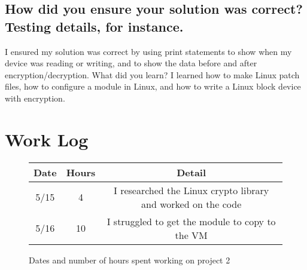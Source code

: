\documentclass[journal,letterpaper,draftclsnofoot,onecolumn,10pt]{IEEEtran}
\begin{document}
\subsection{How did you ensure your solution was correct? Testing details, for instance.}
I ensured my solution was correct by using print statements to show when my device was reading or writing, and to show the data before and after encryption/decryption.
{What did you learn?}
I learned how to make Linux patch files, how to configure a module in Linux, and how to write a Linux block device with encryption.

\section{Work Log}

\begin{figure}[H]
   \begin{tabular}{c | c | c}
      Date & Hours & Detail\\
      \hline
      5/15 & 4 & I researched the Linux crypto library and worked on the code\\
      \hline
      5/16 & 10 & I struggled to get the module to copy to the VM\\
      \hline
   \end{tabular}
   \caption{Dates and number of hours spent working on project 2}
\end{figure}
      
\end{document}
